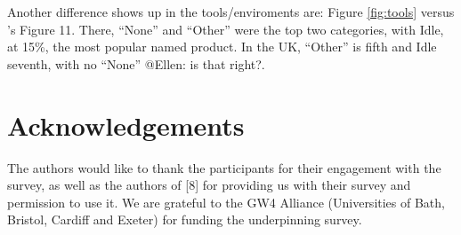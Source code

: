 \documentclass{sig-alternate}
\begin{document}
Another difference shows up in the tools/enviroments are: Figure
\ref{fig:tools} versus \cite{mason+cooper:2014}'s Figure 11. There,
``None'' and ``Other'' were the top two categories, with Idle, at
15\%, the most popular named product. In the UK, ``Other'' is fifth
and Idle seventh, with no ``None'' @Ellen: is that right?.


\section{Acknowledgements}

The authors would like to thank the participants for their engagement
with the survey, as well as the authors of [8] for providing us with
their survey and permission to use it.
We are grateful to the GW4 Alliance (Universities of Bath, Bristol,
Cardiff and Exeter) for funding the underpinning survey.


\end{document}
